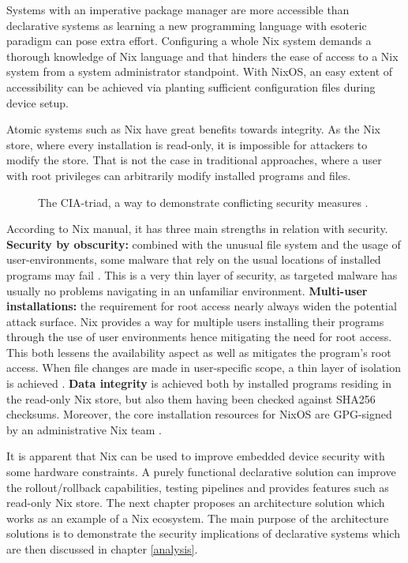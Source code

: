 Systems with an imperative package manager are more accessible than
declarative systems as learning a new programming language with
esoteric paradigm can pose extra effort. Configuring a whole Nix
system demands a thorough knowledge of Nix language and that
hinders the ease of access to a Nix system from a system
administrator standpoint. With NixOS, an easy extent of accessibility
can be achieved via planting sufficient configuration files during
device setup.

Atomic systems such as Nix have great benefits towards integrity. As
the Nix store, where every installation is read-only,
it is impossible for attackers to modify the store. That is not the
case in traditional approaches, where a user with root privileges can arbitrarily modify installed
programs and files.

\begin{figure}[t!]
\centerline{}
\caption{The CIA-triad, a way to demonstrate conflicting security
  measures \cite{hughes2013quantitative}.}
\label{ciatriad}
\end{figure}

According to Nix manual, it has three main strengths in relation with
security. \textbf{Security by obscurity: }combined with the unusual
file system and the usage of user-environments, some malware that rely
on the usual locations of installed programs may fail
\cite{nixosSecurityNixOS}. This is a very thin layer of security, as
targeted malware has usually no problems navigating in an unfamiliar
environment. \textbf{Multi-user installations: }the requirement for
root access nearly always widen the potential attack surface. Nix
provides a way for multiple users installing their programs through
the use of user environments hence mitigating the need for root
access. This both lessens the availability aspect as well as
mitigates the program's root access. When file changes are made in
user-specific scope, a thin layer of isolation is achieved
\cite{nixosNixOSManual}. \textbf{Data integrity} is achieved both by
installed programs residing in the read-only Nix store, but also them
having been checked against SHA256 checksums. Moreover, the core
installation resources for NixOS are GPG-signed by an administrative
Nix team \cite{nixosSecurityNixOS}.

It is apparent that Nix can be used to improve embedded device security
with some hardware constraints. A purely functional declarative
solution can improve the rollout/rollback capabilities, testing
pipelines and provides features such as read-only Nix store. The next
chapter proposes an architecture solution which works as an example of
a Nix ecosystem. The main purpose of the architecture solutions is to
demonstrate the security implications of declarative systems which are then discussed 
in chapter \ref{analysis}. 
